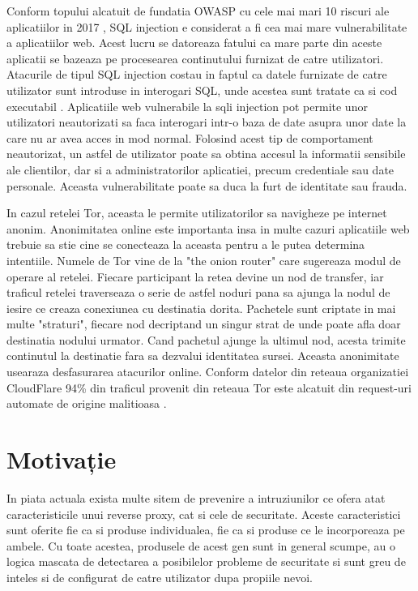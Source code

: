 Conform topului alcatuit de fundatia OWASP cu cele mai mari 10 riscuri ale aplicatiilor in 2017 \cite{owasp}, SQL injection e considerat a fi cea mai mare vulnerabilitate a aplicatiilor web. Acest lucru se datoreaza fatului ca mare parte din aceste aplicatii se bazeaza pe procesearea continutului furnizat de catre utilizatori. Atacurile de tipul SQL injection costau in faptul ca datele furnizate de catre utilizator sunt introduse in interogari SQL, unde acestea sunt tratate ca si cod executabil \cite{classification_and_countermeasures}. Aplicatiile web vulnerabile la sqli injection pot permite unor utilizatori neautorizati sa faca interogari intr-o baza de date asupra unor date la care nu ar avea acces in mod normal. Folosind acest tip de comportament neautorizat, un astfel de utilizator poate sa obtina accesul la informatii sensibile ale clientilor, dar si a administratorilor aplicatiei, precum credentiale sau date personale. Aceasta vulnerabilitate poate sa duca la furt de identitate sau frauda. 

In cazul retelei Tor, aceasta le permite utilizatorilor sa navigheze pe internet anonim. Anonimitatea online este importanta insa in multe cazuri aplicatiile web trebuie sa stie cine se conecteaza la aceasta pentru a le putea determina intentiile. Numele de Tor vine de la "the onion router" care sugereaza modul de operare al retelei. Fiecare participant la retea devine un nod de transfer, iar traficul retelei traverseaza o serie de astfel noduri pana sa ajunga la nodul de iesire ce creaza conexiunea cu destinatia dorita. Pachetele sunt criptate in mai multe "straturi", fiecare nod decriptand un singur strat de unde poate afla doar destinatia nodului urmator. Cand pachetul ajunge la ultimul nod, acesta trimite continutul la destinatie fara sa dezvalui identitatea sursei. Aceasta anonimitate usearaza desfasurarea atacurilor online. Conform datelor din reteaua organizatiei CloudFlare 94\% din traficul provenit din reteaua Tor este alcatuit din request-uri automate de origine malitioasa \cite{tor_trouble}.


 \section{Motivație}
In piata actuala exista multe sitem de prevenire a intruziunilor ce ofera atat caracteristicile unui reverse proxy, cat si cele de securitate. Aceste caracteristici sunt oferite fie ca si produse individualea, fie ca si produse ce le incorporeaza pe ambele. Cu toate acestea, produsele de acest gen sunt in general scumpe, au o logica mascata de detectarea a posibilelor probleme de securitate si sunt greu de inteles si de configurat de catre utilizator dupa propiile nevoi.


